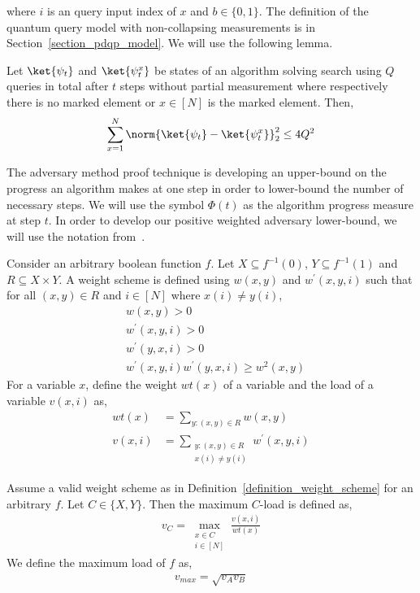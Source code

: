 where $i$ is an query input index of $x$ and $b\in \{0,1\}$. The definition of the quantum query model with non-collapsing measurements is in Section~\ref{section_pdqp_model}. We will use the following lemma.

\begin{lemma}\label{lemma_hybrid_argument} Let $\ket{\psi_t}$ and $\ket{\psi_t^x}$ be states of an algorithm solving search using $Q$ queries in total after $t$ steps without partial measurement where respectively there is no marked element or $x\in [N]$ is the marked element. Then,
\begin{align*}
    \sum_{x=1}^{N} \norm{\ket{\psi_t} - \ket{\psi_t^x}}_2^2 \leq 4Q^2
\end{align*}
\end{lemma}

The adversary method proof technique is developing an upper-bound on the progress an algorithm makes at one step in order to lower-bound the number of necessary steps. We will use the symbol $\Phi(t)$ as the algorithm progress measure at step $t$. In order to develop our positive weighted adversary lower-bound, we will use the notation from~\cite{weighted_adversary}.

\begin{definition}\label{definition_weight_scheme}
    Consider an arbitrary boolean function $f$. Let $X\subseteq f^{-1}(0)$, $Y\subseteq f^{-1}(1)$ and $R\subseteq X\times Y$. A weight scheme is defined using $w(x,y)$ and $w^\prime(x,y,i)$ such that for all $(x,y)\in R$ and $i\in [N]$ where $x(i)\neq y(i)$,
    \begin{align*}
        &w(x,y)>0 \\
         &w^\prime(x,y,i)>0 \\
         &w^\prime (y,x,i)>0 \\
         &w^\prime(x,y,i)w^\prime (y,x,i)\geq w^2(x,y)
    \end{align*}
    For a variable $x$, define the weight $wt(x)$ of a variable and the load of a variable $v(x,i)$ as,
    \begin{align*}
        wt(x)&=\sum_{y: (x,y)\in R} w(x,y)\\
        v(x,i) &= \sum_{\substack{y: (x,y)\in R \\ x(i)\neq y(i)}} w^\prime (x,y,i)
    \end{align*}
\end{definition}

\begin{definition}\label{definition_weight_load}
    Assume a valid weight scheme as in Definition~\ref{definition_weight_scheme} for an arbitrary $f$. Let $C\in\{X,Y\}$. Then the maximum  $C$-load is defined as,
    \begin{align*}
        v_C = \max_{\substack{x\in C \\ i\in [N]}} \frac{v(x,i)}{wt(x)}
    \end{align*}
    We define the maximum load of $f$ as,
    \begin{align*}
        v_{max} = \sqrt{v_A v_B}
    \end{align*}
\end{definition}

